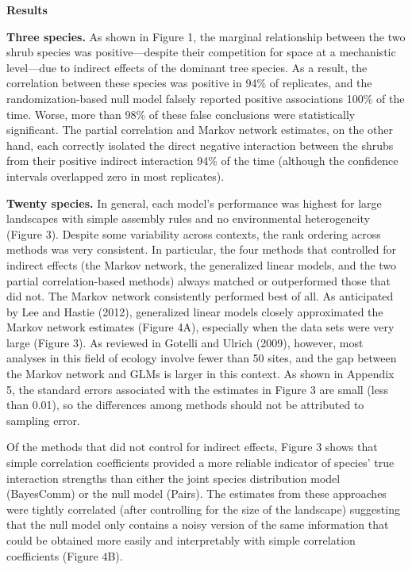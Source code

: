\documentclass[12pt,]{article}
\begin{document}
\begin{spacing}{1.9}
\begin{flushleft}
\noindent
\textbf{Results}

\noindent \textbf{Three species.} As shown in Figure 1, the marginal
relationship between the two shrub species was positive---despite their
competition for space at a mechanistic level---due to indirect effects
of the dominant tree species. As a result, the correlation between these
species was positive in 94\% of replicates, and the randomization-based
null model falsely reported positive associations 100\% of the time.
Worse, more than 98\% of these false conclusions were statistically
significant. The partial correlation and Markov network estimates, on
the other hand, each correctly isolated the direct negative interaction
between the shrubs from their positive indirect interaction 94\% of the
time (although the confidence intervals overlapped zero in most
replicates).

\noindent
\textbf{Twenty species.} In general, each model's performance was
highest for large landscapes with simple assembly rules and no
environmental heterogeneity (Figure 3). Despite some variability across
contexts, the rank ordering across methods was very consistent. In
particular, the four methods that controlled for indirect effects (the
Markov network, the generalized linear models, and the two partial
correlation-based methods) always matched or outperformed those that did
not. The Markov network consistently performed best of all. As
anticipated by Lee and Hastie (2012), generalized linear models closely
approximated the Markov network estimates (Figure 4A), especially when
the data sets were very large (Figure 3). As reviewed in Gotelli and
Ulrich (2009), however, most analyses in this field of ecology involve
fewer than 50 sites, and the gap between the Markov network and GLMs is
larger in this context. As shown in Appendix 5, the standard errors
associated with the estimates in Figure 3 are small (less than 0.01), so
the differences among methods should not be attributed to sampling
error.

Of the methods that did not control for indirect effects, Figure 3 shows
that simple correlation coefficients provided a more reliable indicator
of species' true interaction strengths than either the joint species
distribution model (BayesComm) or the null model (Pairs). The estimates
from these approaches were tightly correlated (after controlling for the
size of the landscape) suggesting that the null model only contains a
noisy version of the same information that could be obtained more easily
and interpretably with simple correlation coefficients (Figure 4B).


\end{flushleft}
\end{spacing}
\end{document}
